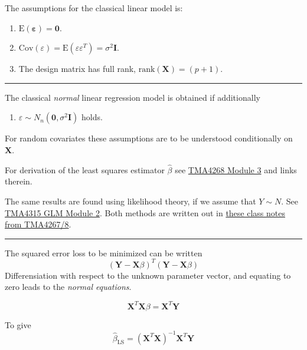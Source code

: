 \documentclass[
  letterpaper,
  DIV=11,
  numbers=noendperiod]{scrartcl}
\providecommand{\tightlist}{%
  \setlength{\itemsep}{0pt}\setlength{\parskip}{0pt}}\usepackage{longtable,booktabs,array}
\begin{document}
The assumptions for the classical linear model is:

\begin{enumerate}
\def\labelenumi{\arabic{enumi}.}
\item
  \(\text{E}(\mathbf{\varepsilon})=\mathbf{0}\).
\item
  \(\text{Cov}(\varepsilon)=\text{E}(\varepsilon \varepsilon^T)=\sigma^2\mathbf{I}\).
\item
  The design matrix has full rank, \(\text{rank}({\mathbf X})=(p+1)\).
\end{enumerate}

\begin{center}\rule{0.5\linewidth}{0.5pt}\end{center}

The classical \emph{normal} linear regression model is obtained if
additionally

\begin{enumerate}
\def\labelenumi{\arabic{enumi}.}
\setcounter{enumi}{3}
\tightlist
\item
  \(\varepsilon\sim N_n(\mathbf{0},\sigma^2\mathbf{I})\) holds.
\end{enumerate}

For random covariates these assumptions are to be understood
conditionally on \(\mathbf{X}\).

For derivation of the least squares estimator \(\hat{\beta}\) see
\href{https://www.math.ntnu.no/emner/TMA4268/2019v/3LinReg/3LinReg.html\#parameter_estimation}{TMA4268
Module 3} and links therein.

The same results are found using likelihood theory, if we assume that
\(Y\sim N\). See
\href{https://www.math.ntnu.no/emner/TMA4315/2018h/2MLR.html\#likelihood_theory_(from_b4)}{TMA4315
GLM Module 2}. Both methods are written out in
\href{https://www.math.ntnu.no/emner/TMA4268/2018v/notes/LeastSquaresMLR.pdf}{these
class notes from TMA4267/8}.

\begin{center}\rule{0.5\linewidth}{0.5pt}\end{center}

The squared error loss to be minimized can be written
\[({\mathbf Y}-{\mathbf X}{{\beta}})^T({\mathbf Y}-{\mathbf X}{{\beta}})\]
Differensiation with respect to the unknown parameter vector, and
equating to zero leads to the \emph{normal equations}.

\[{\mathbf X}^T{\mathbf X}{\beta}= {\mathbf X}^T {\mathbf Y}\]

To give
\[\hat{\beta}_{\text{LS}}=({\mathbf X}^T{\mathbf X})^{-1} {\mathbf X}^T {\mathbf Y}\]
\end{document}
